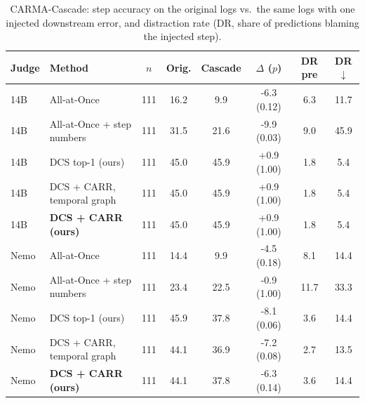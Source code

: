 \begin{table}[t]
\centering
\caption{CARMA-Cascade: step accuracy on the original logs vs.\ the same logs with one injected downstream error, and distraction rate (DR, share of predictions blaming the injected step).}
\label{tab:cascade}
\footnotesize
\setlength{\tabcolsep}{3pt}
\begin{tabular}{@{}llcccccc@{}}
\toprule
Judge & Method & $n$ & Orig. & Cascade & $\Delta$ ($p$) & DR pre & DR$\downarrow$ \\
\midrule
14B & All-at-Once & 111 & 16.2 & 9.9 & -6.3 (0.12) & 6.3 & 11.7 \\
14B & All-at-Once + step numbers & 111 & 31.5 & 21.6 & -9.9 (0.03) & 9.0 & 45.9 \\
14B & DCS top-1 (ours) & 111 & 45.0 & 45.9 & +0.9 (1.00) & 1.8 & 5.4 \\
14B & DCS + CARR, temporal graph & 111 & 45.0 & 45.9 & +0.9 (1.00) & 1.8 & 5.4 \\
14B & \textbf{DCS + CARR (ours)} & 111 & 45.0 & 45.9 & +0.9 (1.00) & 1.8 & 5.4 \\
Nemo & All-at-Once & 111 & 14.4 & 9.9 & -4.5 (0.18) & 8.1 & 14.4 \\
Nemo & All-at-Once + step numbers & 111 & 23.4 & 22.5 & -0.9 (1.00) & 11.7 & 33.3 \\
Nemo & DCS top-1 (ours) & 111 & 45.9 & 37.8 & -8.1 (0.06) & 3.6 & 14.4 \\
Nemo & DCS + CARR, temporal graph & 111 & 44.1 & 36.9 & -7.2 (0.08) & 2.7 & 13.5 \\
Nemo & \textbf{DCS + CARR (ours)} & 111 & 44.1 & 37.8 & -6.3 (0.14) & 3.6 & 14.4 \\
\bottomrule
\end{tabular}
\end{table}